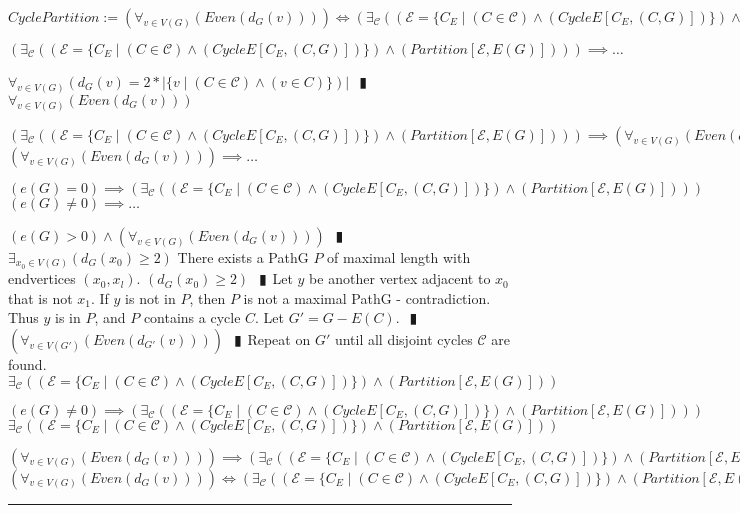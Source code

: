 \documentclass{book}
\newcommand{\abr}{:=}
\newcommand{\pipe}{$\phantom{(}\vrectangleblack\phantom{)}$}
\newcommand{\pr}[1]{\left(#1\right)}
\newcommand{\st}{\mathbin{|}}
\begin{document}
$CyclePartition \abr \pr{\forall_{v \in V(G)}\pr{Even\pr{d_G(v)}}} \iff \pr{\exists_{\mathcal{C}}\pr{\pr{\mathcal{E} = \{C_E \st (C \in \mathcal{C}) \land \pr{CycleE[C_E, (C, G)]}\}} \land \pr{Partition[\mathcal{E}, E(G)]}}}$ \\
\begin{enumerate}
  \lit $\pr{\exists_{\mathcal{C}}\pr{\pr{\mathcal{E} = \{C_E \st (C \in \mathcal{C}) \land \pr{CycleE[C_E, (C, G)]}\}} \land \pr{Partition[\mathcal{E}, E(G)]}}} \implies \ldots$
  \begin{enumerate}
    \lit $\forall_{v \in V(G)}\pr{d_G(v) = 2 * |\{v \st (C \in \mathcal{C}) \land (v \in C)\}}|$ \pipe $\forall_{v \in V(G)}\pr{Even\pr{d_G(v)}}$
  \end{enumerate}
  \lit $\pr{\exists_{\mathcal{C}}\pr{\pr{\mathcal{E} = \{C_E \st (C \in \mathcal{C}) \land \pr{CycleE[C_E, (C, G)]}\}} \land \pr{Partition[\mathcal{E}, E(G)]}}} \implies \pr{\forall_{v \in V(G)}\pr{Even\pr{d_G(v)}}}$
  \lit $\pr{\forall_{v \in V(G)}\pr{Even\pr{d_G(v)}}} \implies \ldots$
  \begin{enumerate}
    \lit $\pr{e(G) = 0} \implies \pr{\exists_{\mathcal{C}}\pr{\pr{\mathcal{E} = \{C_E \st (C \in \mathcal{C}) \land \pr{CycleE[C_E, (C, G)]}\}} \land \pr{Partition[\mathcal{E}, E(G)]}}}$
    \lit $\pr{e(G) \neq 0} \implies \ldots$
    \begin{enumerate}
      \lit $\pr{e(G) > 0} \land \pr{\forall_{v \in V(G)}\pr{Even\pr{d_G(v)}}}$ \pipe $\exists_{x_0 \in V(G)}\pr{d_G(x_0) \geq 2}$
      \lit There exists a PathG $P$ of maximal length with endvertices $(x_0, x_l)$.
      \lit $\pr{d_G(x_0) \geq 2}$ \pipe Let $y$ be another vertex adjacent to $x_0$ that is not $x_1$.
      \lit If $y$ is not in $P$, then $P$ is not a maximal PathG - contradiction.
      \lit Thus $y$ is in $P$, and $P$ contains a cycle $C$.
      \lit Let $G' = G - E(C)$. \pipe $\pr{\forall_{v \in V(G')}\pr{Even\pr{d_{G'}(v)}}}$ \pipe Repeat on $G'$ until all disjoint cycles $\mathcal{C}$ are found.
      \lit $\exists_{\mathcal{C}}\pr{\pr{\mathcal{E} = \{C_E \st (C \in \mathcal{C}) \land \pr{CycleE[C_E, (C, G)]}\}} \land \pr{Partition[\mathcal{E}, E(G)]}}$
    \end{enumerate}
    \lit $\pr{e(G) \neq 0} \implies \pr{\exists_{\mathcal{C}}\pr{\pr{\mathcal{E} = \{C_E \st (C \in \mathcal{C}) \land \pr{CycleE[C_E, (C, G)]}\}} \land \pr{Partition[\mathcal{E}, E(G)]}}}$
    \lit $\exists_{\mathcal{C}}\pr{\pr{\mathcal{E} = \{C_E \st (C \in \mathcal{C}) \land \pr{CycleE[C_E, (C, G)]}\}} \land \pr{Partition[\mathcal{E}, E(G)]}}$
  \end{enumerate}
  \lit $\pr{\forall_{v \in V(G)}\pr{Even\pr{d_G(v)}}} \implies \pr{\exists_{\mathcal{C}}\pr{\pr{\mathcal{E} = \{C_E \st (C \in \mathcal{C}) \land \pr{CycleE[C_E, (C, G)]}\}} \land \pr{Partition[\mathcal{E}, E(G)]}}}$
  \lit $\pr{\forall_{v \in V(G)}\pr{Even\pr{d_G(v)}}} \iff \pr{\exists_{\mathcal{C}}\pr{\pr{\mathcal{E} = \{C_E \st (C \in \mathcal{C}) \land \pr{CycleE[C_E, (C, G)]}\}} \land \pr{Partition[\mathcal{E}, E(G)]}}}$
\end{enumerate} \vspace{.75mm} \hrule \vspace{.75mm} \ \\ 
\end{document}
